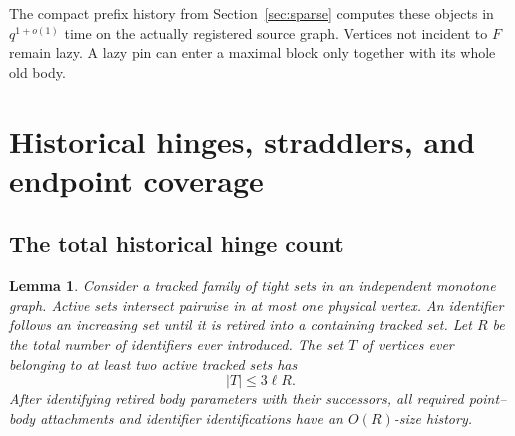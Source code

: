 \documentclass[11pt,a4paper]{article}
\newtheorem{lemma}[theorem]{Lemma}
\theoremstyle{definition}
\theoremstyle{remark}
\begin{document}
The compact prefix history from Section~\ref{sec:sparse}
computes these objects in $q^{1+o(1)}$ time on the actually
registered source graph. Vertices not incident to $F$
remain lazy. A lazy pin can enter a maximal block only
together with its whole old body.

\section{Historical hinges, straddlers, and endpoint coverage}
\label{sec:cover}

\subsection{The total historical hinge count}

\begin{lemma}\label{lem:hinges}
Consider a tracked family of tight sets in an independent
monotone graph. Active sets intersect pairwise in at most
one physical vertex. An identifier follows an increasing
set until it is retired into a containing tracked set.
Let $R$ be the total number of identifiers ever introduced.
The set $T$ of vertices ever belonging to at least two
active tracked sets has
\[
 |T|\leq3\ell R.
\]
After identifying retired body parameters with their
successors, all required point--body attachments and
identifier identifications have an $O(R)$-size history.
\end{lemma}
\end{document}
